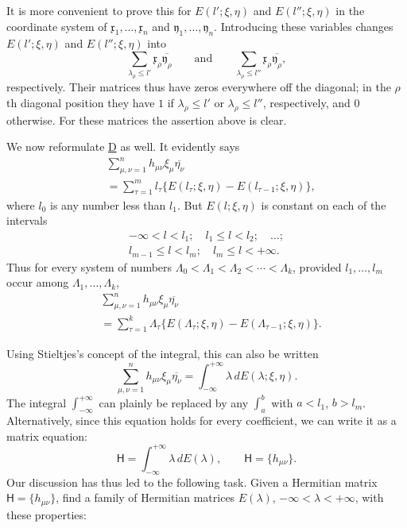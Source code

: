 \documentclass[fontsize=13pt,twoside,openany,headings=normal,parskip=false,bookmarkpackage=false,DIV=calc]{scrbook}
\begin{document}
It is more convenient to prove this for $E(l';\xi,\eta)$ and $E(l'';\xi,\eta)$ in the coordinate system of $\mathfrak{x}_1,\ldots,\mathfrak{x}_n$ and $\mathfrak{y}_1,\ldots,\mathfrak{y}_n$. Introducing these variables changes $E(l';\xi,\eta)$ and $E(l'';\xi,\eta)$ into
\[
\sum_{\lambda_\rho\leq l'}\mathfrak{x}_\rho\overline{\mathfrak{y}_\rho}
\qquad\text{and}\qquad
\sum_{\lambda_\rho\leq l''}\mathfrak{x}_\rho\overline{\mathfrak{y}_\rho},
\]
respectively. Their matrices thus have zeros everywhere off the diagonal; in the $\rho$th diagonal position they have $1$ if $\lambda_\rho\leq l'$ or $\lambda_\rho\leq l''$, respectively, and $0$ otherwise. For these matrices the assertion above is clear.

We now reformulate \hyperref[eq:II.7.D]{D} as well. It evidently says
\begin{align*}
&\sum_{\mu,\nu=1}^n h_{\mu\nu}\xi_\mu\overline{\eta_\nu}\\
&=\sum_{\tau=1}^m l_\tau\{E(l_\tau;\xi,\eta)-E(l_{\tau-1};\xi,\eta)\},
\end{align*}
where $l_0$ is any number less than $l_1$. But $E(l;\xi,\eta)$ is constant on each of the intervals
\begin{gather*}
-\infty<l<l_1;\quad l_1\leq l<l_2;\quad\ldots;\\
 l_{m-1}\leq l<l_m;\quad l_m\leq l<+\infty.
\end{gather*}
Thus for every system of numbers $\Lambda_0<\Lambda_1<\Lambda_2<\cdots<\Lambda_k$, provided $l_1,\ldots,l_m$ occur among $\Lambda_1,\ldots,\Lambda_k$,
\begin{align*}
&\sum_{\mu,\nu=1}^n h_{\mu\nu}\xi_\mu\overline{\eta_\nu}\\
&=\sum_{\tau=1}^k\Lambda_\tau\{E(\Lambda_\tau;\xi,\eta)-E(\Lambda_{\tau-1};\xi,\eta)\}.
\end{align*}

\hypertarget{origpage-59}{}%
Using Stieltjes's concept of the integral, this can also be written
\[
\sum_{\mu,\nu=1}^n h_{\mu\nu}\xi_\mu\overline{\eta_\nu}
=\int_{-\infty}^{+\infty}\lambda\,dE(\lambda;\xi,\eta).
\]
The integral $\int_{-\infty}^{+\infty}$ can plainly be replaced by any $\int_a^b$ with $a<l_1$, $b>l_m$. Alternatively, since this equation holds for every coefficient, we can write it as a matrix equation:
\[
\mathsf H=\int_{-\infty}^{+\infty}\lambda\,dE(\lambda),\qquad \mathsf H=\{h_{\mu\nu}\}.
\]
Our discussion has thus led to the following task. Given a Hermitian matrix $\mathsf H=\{h_{\mu\nu}\}$, find a family of Hermitian matrices $E(\lambda)$, $-\infty<\lambda<+\infty$, with these properties:
\end{document}

